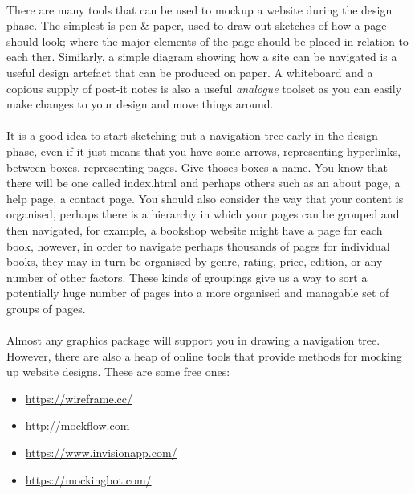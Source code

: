 \documentclass[10pt, a4paper, twosize]{article}
\begin{document}
\paragraph{} There are many tools that can be used to mockup a website during the design phase. The simplest is pen \& paper, used to draw out sketches of how a page should look; where the major elements of the page should be placed in relation to each ther. Similarly, a simple diagram showing how a site can be navigated is a useful design artefact that can be produced on paper. A whiteboard and a copious supply of post-it notes is also a useful \emph{analogue} toolset as you can easily make changes to your design and move things around.

\paragraph{} It is a good idea to start sketching out a navigation tree early in the design phase, even if it just means that you have some arrows, representing hyperlinks, between boxes, representing pages. Give thoses boxes a name. You know that there will be one called index.html and perhaps others such as an about page, a help page, a contact page. You should also consider the way that your content is organised, perhaps there is a hierarchy in which your pages can be grouped and then navigated, for example, a bookshop website might have a page for each book, however, in order to navigate perhaps thousands of pages for individual books, they may in turn be organised by genre, rating, price, edition, or any number of other factors. These kinds of groupings give us a way to sort a potentially huge number of pages into a more organised and managable set of groups of pages.


\paragraph{} Almost any graphics package will support you in drawing a navigation tree. However, there are also a heap of online tools that provide methods for mocking up website designs. These are some free ones:

\begin{itemize}
\item \url{https://wireframe.cc/}
\item \url{http://mockflow.com}
\item \url{https://www.invisionapp.com/}
\item \url{https://mockingbot.com/}
\end{itemize}
\end{document}
